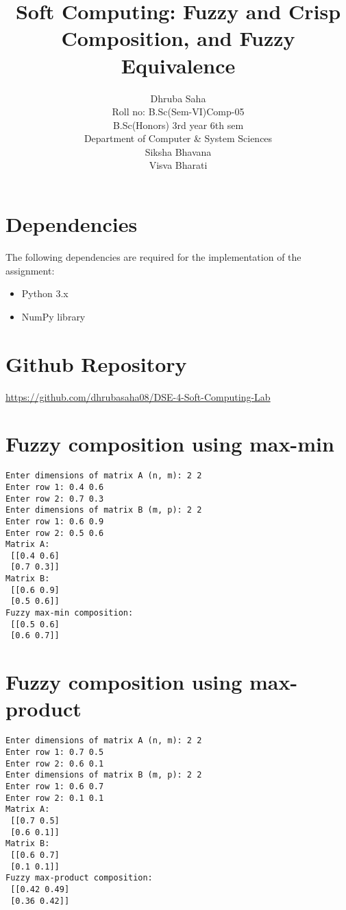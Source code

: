 \documentclass[12pt]{article}
\title{Soft Computing: Fuzzy and Crisp Composition, and Fuzzy Equivalence}
\author{Dhruba Saha \\
Roll no: B.Sc(Sem-VI)Comp-05 \\
B.Sc(Honors) 3rd year 6th sem \\
Department of Computer \& System Sciences \\
Siksha Bhavana \\
Visva Bharati}
\date{}
\begin{document}
\maketitle

\newpage
\section*{Dependencies}
The following dependencies are required for the implementation of the assignment:

\begin{itemize}
    \item Python 3.x
    \item NumPy library
\end{itemize}

\section*{Github Repository}
\url{https://github.com/dhrubasaha08/DSE-4-Soft-Computing-Lab}

\newpage
\section{Fuzzy composition using max-min}



\newpage
\begin{lstlisting}[caption=Output of Fuzzy max-min composition]
Enter dimensions of matrix A (n, m): 2 2
Enter row 1: 0.4 0.6
Enter row 2: 0.7 0.3
Enter dimensions of matrix B (m, p): 2 2
Enter row 1: 0.6 0.9
Enter row 2: 0.5 0.6
Matrix A:
 [[0.4 0.6]
 [0.7 0.3]]
Matrix B:
 [[0.6 0.9]
 [0.5 0.6]]
Fuzzy max-min composition:
 [[0.5 0.6]
 [0.6 0.7]]
\end{lstlisting}

\newpage
\section{Fuzzy composition using max-product}



\newpage
\begin{lstlisting}[caption=Output of Fuzzy max-product composition]
Enter dimensions of matrix A (n, m): 2 2
Enter row 1: 0.7 0.5
Enter row 2: 0.6 0.1
Enter dimensions of matrix B (m, p): 2 2
Enter row 1: 0.6 0.7
Enter row 2: 0.1 0.1
Matrix A:
 [[0.7 0.5]
 [0.6 0.1]]
Matrix B:
 [[0.6 0.7]
 [0.1 0.1]]
Fuzzy max-product composition:
 [[0.42 0.49]
 [0.36 0.42]]
\end{lstlisting}
\end{document}
